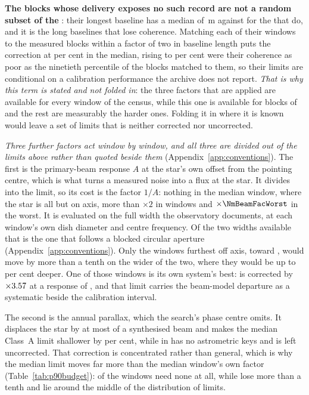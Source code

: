 \textbf{The \RpDecNUn{} blocks whose delivery exposes no such record are not
a random subset of the \SensDecorNBlkTot}: their longest baseline has a median
of \RpDecBlUn\,m against \RpDecBlMeas{} for the \SensDecorNBlk{} that do, and
it is the long baselines that lose coherence. Matching each of their windows
to the measured blocks within a factor of two in baseline length puts the
correction at \RpDecMatchMed{} per cent in the median, rising to
\RpDecMatchHi{} per cent were their coherence as poor as the ninetieth
percentile of the blocks matched to them, so their limits are conditional on
a calibration performance the archive does not report. \emph{That is why this
term is stated and not folded in}: the three factors that are applied are
available for every window of the census, while this one is available for
\SensDecorNBlk{} blocks of \SensDecorNBlkTot{} and the rest are measurably
the harder ones. Folding it in where it is known would leave a set of limits
that is neither corrected nor uncorrected.

\emph{Three further factors act window by window, and all three are divided
out of the limits above rather than quoted beside them}
(Appendix~\ref{app:conventions}). The first is the primary-beam response
$A$ at the star's own offset from the pointing centre, which is what turns a
measured noise into a flux at the star. It divides into the limit, so its
cost is the factor $1/A$: nothing in the median window, where the star is all
but on axis, more than $\times2$ in \NmBeamNFacTwo{} windows and
$\times\NmBeamFacWorst$ in the worst. It is evaluated on the full width the
observatory documents, at each window's own dish diameter and centre
frequency. Of the two widths available that is the one that follows a blocked
circular aperture (Appendix~\ref{app:conventions}). Only the
\BmNAboveTenPct{} windows furthest off axis, toward \BnStarList, would move
by more than a tenth on the wider of the two, where they would be up to
\BmShiftMaxPct{} per cent deeper. One of those windows is its own system's
best: \BnBestSys{} is corrected by $\times3.57$ at a response of
\BnBestResp, and that limit carries the beam-model departure as a
systematic beside the calibration interval.

The second is the annual parallax, which the search's phase centre omits. It
displaces the star by at most \SensBeamsMax{} of a synthesised beam and makes
the median Class~A limit shallower by \PxaShiftWinPct{} per cent, while
\PxaMissingStar{} in \PxaMissingEb{} has no astrometric keys and is left
uncorrected. That correction is concentrated rather than general, which is
why the median limit moves far more than the median window's own factor
(Table~\ref{tab:p90budget}): \RpPxNNone{} of the \NWinA{} windows need none
at all, while \RpPxNBig{} lose more than a tenth and lie around the middle of
the distribution of limits.

